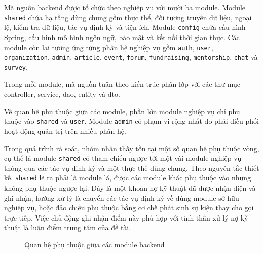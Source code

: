 \documentclass[12pt,a4paper,oneside]{report}
\begin{document}
Mã nguồn backend được tổ chức theo nghiệp vụ với mười ba module. Module \texttt{shared} chứa hạ tầng dùng chung gồm thực thể, đối tượng truyền dữ liệu, ngoại lệ, kiểm tra dữ liệu, tác vụ định kỳ và tiện ích. Module \texttt{config} chứa cấu hình Spring, cấu hình mô hình ngôn ngữ, bảo mật và kết nối thời gian thực. Các module còn lại tương ứng từng phân hệ nghiệp vụ gồm \texttt{auth}, \texttt{user}, \texttt{organization}, \texttt{admin}, \texttt{article}, \texttt{event}, \texttt{forum}, \texttt{fundraising}, \texttt{mentorship}, \texttt{chat} và \texttt{survey}.

Trong mỗi module, mã nguồn tuân theo kiến trúc phân lớp với các thư mục controller, service, dao, entity và dto.

Về quan hệ phụ thuộc giữa các module, phần lớn module nghiệp vụ chỉ phụ thuộc vào \texttt{shared} và \texttt{user}. Module \texttt{admin} có phạm vi rộng nhất do phải điều phối hoạt động quản trị trên nhiều phân hệ.

Trong quá trình rà soát, nhóm nhận thấy tồn tại một số quan hệ phụ thuộc vòng, cụ thể là module \texttt{shared} có tham chiếu ngược tới một vài module nghiệp vụ thông qua các tác vụ định kỳ và một thực thể dùng chung. Theo nguyên tắc thiết kế, \texttt{shared} lẽ ra phải là module lá, được các module khác phụ thuộc vào nhưng không phụ thuộc ngược lại. Đây là một khoản nợ kỹ thuật đã được nhận diện và ghi nhận, hướng xử lý là chuyển các tác vụ định kỳ về đúng module sở hữu nghiệp vụ, hoặc đảo chiều phụ thuộc bằng cơ chế phát sinh sự kiện thay cho gọi trực tiếp. Việc chủ động ghi nhận điểm này phù hợp với tinh thần xử lý nợ kỹ thuật là luận điểm trung tâm của đề tài.

\begin{figure}[htbp]\centering
{}
\caption{Quan hệ phụ thuộc giữa các module backend}
\label{fig:moduledeps}
\end{figure}
\end{document}
